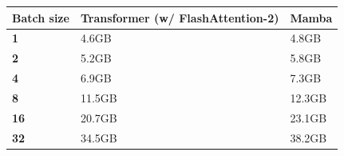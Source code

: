 \begin{tabular}{lll}
\hline
\textbf{Batch size} & \textbf{Transformer (w/ FlashAttention-2)} & \textbf{Mamba} \\
\hline
\textbf{1} & 4.6GB & 4.8GB \\
\textbf{2} & 5.2GB & 5.8GB \\
\textbf{4} & 6.9GB & 7.3GB \\
\textbf{8} & 11.5GB & 12.3GB \\
\textbf{16} & 20.7GB & 23.1GB \\
\textbf{32} & 34.5GB & 38.2GB \\
\hline
\end{tabular}
